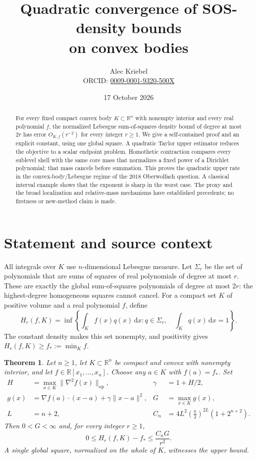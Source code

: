 \documentclass[11pt]{article}
\title{Quadratic convergence of SOS-density bounds\\on convex bodies}
\author{Alec Kriebel\\
  \small ORCID: \href{https://orcid.org/0009-0001-9320-500X}{0009-0001-9320-500X}}
\date{17 October 2026}
\newtheorem{theorem}{Theorem}
\newcommand{\R}{\mathbb R}
\newcommand{\op}{\mathrm{op}}
\newcommand{\dd}{\,\mathrm{d}}
\begin{document}
\maketitle

\begin{abstract}
For every fixed compact convex body $K\subset\R^n$ with nonempty
interior and every real polynomial $f$, the normalized Lebesgue
sum-of-squares density bound of degree at most $2r$ has error
$O_{K,f}(r^{-2})$ for every integer $r\ge1$.
We give a self-contained proof and an explicit constant, using one
global square. A quadratic Taylor upper estimator reduces the objective
to a scalar endpoint problem. Homothetic contraction compares every
sublevel shell with the same core mass that normalizes a fixed power of
a Dirichlet polynomial; that mass cancels before summation. This proves
the quadratic upper rate in the convex-body/Lebesgue regime of the
2018 Oberwolfach question. A classical interval example shows that the
exponent is sharp in the worst case. The proxy and the broad
localization and relative-mass mechanisms have established precedents;
no firstness or new-method claim is made.
\end{abstract}

\section{Statement and source context}

All integrals over $K$ use $n$-dimensional Lebesgue measure.
Let $\Sigma_r$ be the set of polynomials that are sums of squares of
real polynomials of degree at most $r$. These are exactly the global
sum-of-squares polynomials of degree at most $2r$: the highest-degree
homogeneous squares cannot cancel. For a compact set $K$ of positive
volume and a real polynomial $f$, define
\begin{equation}\label{eq:hierarchy}
 H_r(f,K)=\inf\left\{\int_K f(x)q(x)\dd x:
       q\in\Sigma_r,\quad \int_Kq(x)\dd x=1\right\}.
\end{equation}
The constant density makes this set nonempty, and positivity gives
$H_r(f,K)\ge f_*:=\min_K f$.

\begin{theorem}\label{thm:main}
Let $n\ge1$, let $K\subset\R^n$ be compact and convex with nonempty
interior, and let $f\in\R[x_1,\ldots,x_n]$. Choose any $a\in K$ with
$f(a)=f_*$. Set
\begin{align*}
 H&=\max_{x\in K}\|\nabla^2f(x)\|_{\op}, &
 \gamma&=1+H/2,\\
 g(x)&=\nabla f(a)\cdot(x-a)+\gamma\|x-a\|^2, &
 G&=\max_{x\in K}g(x),\\
 L&=n+2, &
 C_n&=4L^2\left(\frac\pi2\right)^{2L}(1+2^{n+2}).
\end{align*}
Then $0<G<\infty$ and, for every integer $r\ge1$,
\begin{equation}\label{eq:rate}
 0\le H_r(f,K)-f_*\le \frac{C_nG}{r^2}.
\end{equation}
A single global square, normalized on the whole of $K$, witnesses
the upper bound.
\end{theorem}
\end{document}
